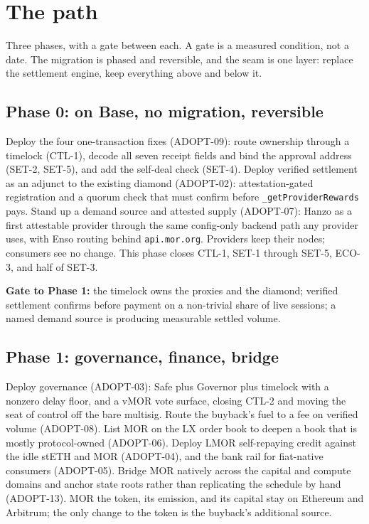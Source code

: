 \documentclass[11pt,a4paper]{article}
\newcommand{\code}[1]{\texttt{\small #1}}
\begin{document}
\section{The path}
\label{sec:path}

Three phases, with a gate between each. A gate is a measured condition, not a date. The
migration is phased and reversible, and the seam is one layer: replace the settlement engine,
keep everything above and below it.

\subsection{Phase 0: on Base, no migration, reversible}

Deploy the four one-transaction fixes (ADOPT-09): route ownership through a timelock (CTL-1),
decode all seven receipt fields and bind the approval address (SET-2, SET-5), and add the
self-deal check (SET-4). Deploy verified settlement as an adjunct to the existing diamond
(ADOPT-02): attestation-gated registration and a quorum check that must confirm before
\code{\_getProviderRewards} pays. Stand up a demand source and attested supply (ADOPT-07): Hanzo
as a first attestable provider through the same config-only backend path any provider uses, with
Enso routing behind \code{api.mor.org}. Providers keep their nodes; consumers see no change.
This phase closes CTL-1, SET-1 through SET-5, ECO-3, and half of SET-3.

\textbf{Gate to Phase 1:} the timelock owns the proxies and the diamond; verified settlement
confirms before payment on a non-trivial share of live sessions; a named demand source is
producing measurable settled volume.

\subsection{Phase 1: governance, finance, bridge}

Deploy governance (ADOPT-03): Safe plus Governor plus timelock with a nonzero delay floor, and a
vMOR vote surface, closing CTL-2 and moving the seat of control off the bare multisig. Route the
buyback's fuel to a fee on verified volume (ADOPT-08). List MOR on the LX order book to deepen a
book that is mostly protocol-owned (ADOPT-06). Deploy LMOR self-repaying credit against the idle
stETH and MOR (ADOPT-04), and the bank rail for fiat-native consumers (ADOPT-05). Bridge MOR
natively across the capital and compute domains and anchor state roots rather than replicating
the schedule by hand (ADOPT-13). MOR the token, its emission, and its capital stay on Ethereum
and Arbitrum; the only change to the token is the buyback's additional source.
\end{document}

